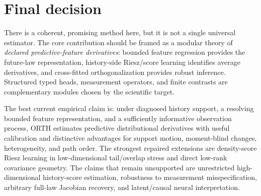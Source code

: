 \documentclass[10.5pt]{article}
\begin{document}
\section{Final decision}

There is a coherent, promising method here, but it is not a single universal estimator.  The core contribution should be framed as a modular theory of \emph{declared predictive-feature derivatives}: bounded feature regression provides the future-law representation, history-side Riesz/score learning identifies average derivatives, and cross-fitted orthogonalization provides robust inference.  Structured typed heads, measurement operators, and finite contrasts are complementary modules chosen by the scientific target.

The best current empirical claim is: under diagnosed history support, a resolving bounded feature representation, and a sufficiently informative observation process, ORTH estimates predictive distributional derivatives with useful calibration and distinctive advantages for support motion, moment-blind changes, heterogeneity, and path order.  The strongest repaired extensions are density-score Riesz learning in low-dimensional tail/overlap stress and direct low-rank covariance geometry.  The claims that remain unsupported are unrestricted high-dimensional history-score estimation, robustness to measurement misspecification, arbitrary full-law Jacobian recovery, and latent/causal neural interpretation.
\end{document}
